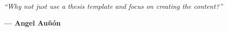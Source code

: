

\vspace*{4.5cm}
\epigraph{\textit{``Why not just use a thesis template and focus on creating the content?''}}{\vspace{0.4cm}\textcolor{\accentColor}{\textbf{%
--- Angel Auñón}}}
